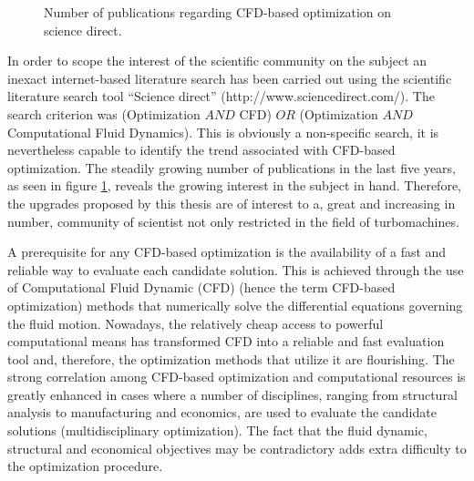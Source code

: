 \begin{figure}[h!]
\begin{minipage}[b]{1\linewidth}
 \centering
\end{minipage}
\caption{Number of publications regarding CFD-based optimization on science direct.} 
\label{pubs.CFD}
\end{figure}

In order to scope the interest of the scientific community on the subject an inexact internet-based literature search has been carried out using the scientific literature search tool ``Science direct'' (http://www.sciencedirect.com/). The search criterion was (Optimization $AND$ CFD) $OR$ (Optimization $AND$ Computational Fluid Dynamics).  This is obviously a non-specific search, it is nevertheless capable to identify the trend associated with CFD-based optimization.  The steadily growing number of publications in the last five years, as seen in figure \ref{pubs.CFD}, reveals the growing interest in the subject in hand. Therefore, the upgrades proposed by this thesis are of interest to a, great and increasing in number, community of scientist not only restricted in the field of turbomachines.     
 
A prerequisite for any CFD-based optimization is the availability of a fast and reliable way to evaluate each candidate solution. This is achieved through the use of Computational Fluid Dynamic (CFD) (hence the term CFD-based optimization) methods that numerically solve the differential equations governing the fluid motion. Nowadays, the relatively cheap access to powerful computational means has transformed CFD into a reliable and fast evaluation tool and, therefore, the optimization methods that utilize it are flourishing. The strong correlation among CFD-based optimization and computational resources is greatly enhanced in cases where a number of disciplines, ranging from structural analysis to manufacturing and economics, are used to evaluate the candidate solutions (multidisciplinary optimization). The fact that the fluid dynamic, structural and economical objectives may be contradictory adds extra difficulty to the optimization procedure.           
 

